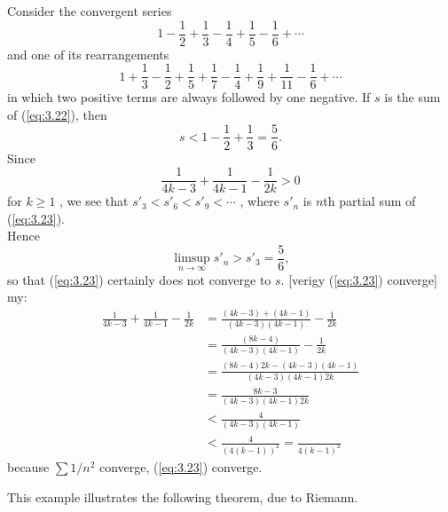 \begin{newexample}
    Consider the convergent series
    \begin{equation}
        \label{eq:3.22}
        1
        -\frac{1}{2}
        +\frac{1}{3}
        -\frac{1}{4}
        +\frac{1}{5}
        -\frac{1}{6}
        +\cdots
    \end{equation}
    and one of its rearrangements
    \begin{equation}
        \label{eq:3.23}
        1
        +\frac{1}{3}
        -\frac{1}{2}
        +\frac{1}{5}
        +\frac{1}{7}
        -\frac{1}{4}
        +\frac{1}{9}
        +\frac{1}{11}
        -\frac{1}{6}
        +\cdots
    \end{equation}
    in which two positive terms are always followed by one negative.
    If $s$ is the sum of (\ref{eq:3.22}), then
    \begin{equation*}
        s < 1 - \frac{1}{2} + \frac{1}{3} = \frac{5}{6}.
    \end{equation*}
    Since
    \begin{equation*}
        \frac{1}{4k-3} + 
        \frac{1}{4k-1} - 
        \frac{1}{2k} > 0
    \end{equation*}
    for $k \geq 1$ , we see that $s'_3 < s'_6 < s'_9 < \cdots$ , where $s'_n$ is $n$th partial sum of (\ref{eq:3.23}).\\    
    Hence
    \begin{equation*}
        \limsup_{n \to \infty} s'_n > s'_3 = \frac{5}{6},
    \end{equation*}
    so that (\ref{eq:3.23}) certainly does not converge to $s$.
    [verigy (\ref{eq:3.23}) converge]
    my:
    \begin{align*}
        \frac{1}{4k-3} + 
        \frac{1}{4k-1} - 
        \frac{1}{2k} 
        &= \frac{(4k-3) + (4k-1)}{(4k-3)(4k-1)} - \frac{1}{2k} \\
        &= \frac{(8k-4)}{(4k-3)(4k-1)} - \frac{1}{2k} \\
        &= \frac{(8k-4)2k - (4k-3)(4k-1)}{(4k-3)(4k-1)2k} \\
        &= \frac{8k-3}{(4k-3)(4k-1)2k} \\
        &< \frac{4}{(4k-3)(4k-1)} \\
        &< \frac{4}{(4(k-1))^2}
        = \frac{}{4(k-1)^2}
    \end{align*}
    because $\sum 1/n^2$ converge, (\ref{eq:3.23}) converge.
\end{newexample}

This example illustrates the following theorem, due to Riemann.

